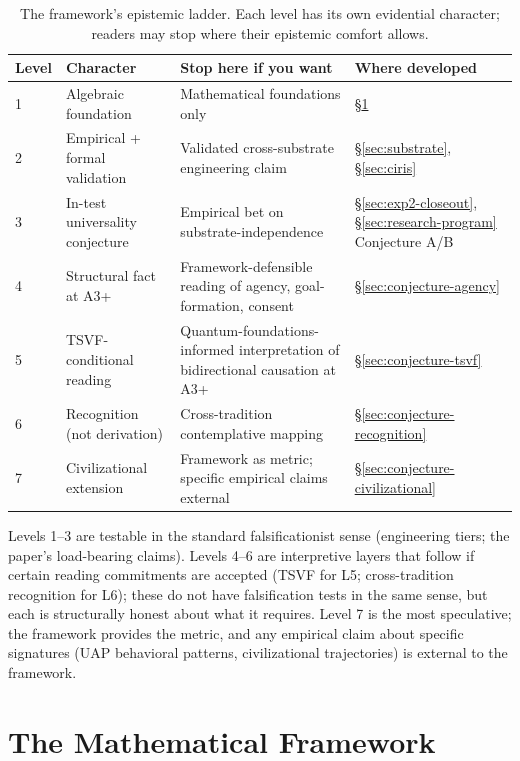 \documentclass[11pt,a4paper]{article}
\begin{document}
\begin{table}[h]
\centering
\small
\begin{tabular}{p{0.5cm}p{3cm}p{4.5cm}p{4cm}}
\toprule
\textbf{Level} & \textbf{Character} & \textbf{Stop here if you want} & \textbf{Where developed} \\
\midrule
1 & Algebraic foundation & Mathematical foundations only & \S\ref{sec:math} \\
2 & Empirical + formal validation & Validated cross-substrate engineering claim & \S\ref{sec:substrate}, \S\ref{sec:ciris} \\
3 & In-test universality conjecture & Empirical bet on substrate-independence & \S\ref{sec:exp2-closeout}, \S\ref{sec:research-program} Conjecture A/B \\
4 & Structural fact at A3+ & Framework-defensible reading of agency, goal-formation, consent & \S\ref{sec:conjecture-agency} \\
5 & TSVF-conditional reading & Quantum-foundations-informed interpretation of bidirectional causation at A3+ & \S\ref{sec:conjecture-tsvf} \\
6 & Recognition (not derivation) & Cross-tradition contemplative mapping & \S\ref{sec:conjecture-recognition} \\
7 & Civilizational extension & Framework as metric; specific empirical claims external & \S\ref{sec:conjecture-civilizational} \\
\bottomrule
\end{tabular}
\caption{The framework's epistemic ladder. Each level has its own evidential character; readers may stop where their epistemic comfort allows.}
\label{tab:epistemic-ladder}
\end{table}

\noindent Levels 1--3 are testable in the standard falsificationist sense (engineering tiers; the paper's load-bearing claims). Levels 4--6 are interpretive layers that follow if certain reading commitments are accepted (TSVF for L5; cross-tradition recognition for L6); these do not have falsification tests in the same sense, but each is structurally honest about what it requires. Level 7 is the most speculative; the framework provides the metric, and any empirical claim about specific signatures (UAP behavioral patterns, civilizational trajectories) is external to the framework.

\section{The Mathematical Framework}
\label{sec:math}
\end{document}
